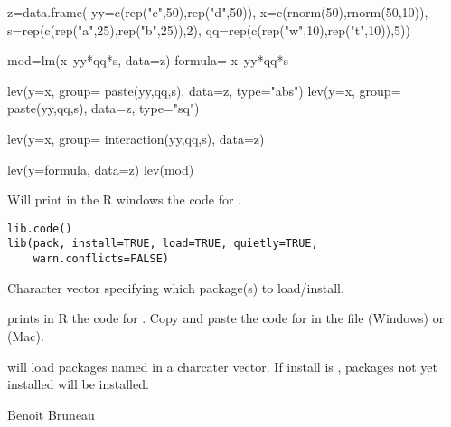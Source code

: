 \documentclass[a4paper]{book}
\begin{document}
%
\begin{Examples}
\begin{ExampleCode}
z=data.frame( yy=c(rep("c",50),rep("d",50)),
              x=c(rnorm(50),rnorm(50,10)),
              s=rep(c(rep("a",25),rep("b",25)),2),
              qq=rep(c(rep("w",10),rep("t",10)),5))

mod=lm(x~yy*qq*s, data=z)
formula= x~yy*qq*s

lev(y=x, group= paste(yy,qq,s), data=z, type="abs")
lev(y=x, group= paste(yy,qq,s), data=z, type="sq")

lev(y=x, group= interaction(yy,qq,s), data=z)

lev(y=formula, data=z)
lev(mod)

\end{ExampleCode}
\end{Examples}
\newpage
{}
%
\begin{Description}\relax
Will print in the R windows the code for  . 
\end{Description}
%
\begin{Usage}
\begin{verbatim}
lib.code()
lib(pack, install=TRUE, load=TRUE, quietly=TRUE, 
    warn.conflicts=FALSE)
\end{verbatim}
\end{Usage}
%
\begin{Arguments}
\begin{ldescription}
\item[\code{pack}] Character vector specifying which package(s) to load/install.

\end{ldescription}
\end{Arguments}
%
\begin{Details}\relax



 prints in R the code for . Copy and paste the code for   
in the file  (Windows) or  (Mac).


 will load packages named in a charcater vector. If install is , 
packages not yet installed will be installed.

\end{Details}
%
\begin{Author}\relax
Benoit Bruneau
\end{Author}
\end{document}
